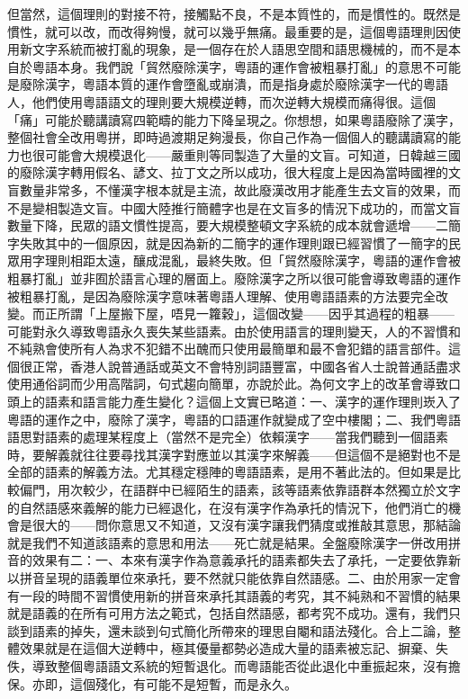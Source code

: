 \documentclass[a5paper, 10pt, openany]{book} %
\begin{document}
但當然，這個理則的對接不符，接觸點不良，不是本質性的，而是慣性的。既然是慣性，就可以改，而改得夠慢，就可以幾乎無痛。最重要的是，這個粵語理則因使用新文字系統而被打亂的現象，是一個存在於人語思空間和語思機械的，而不是本自於粵語本身。我們說「貿然廢除漢字，粵語的運作會被粗暴打亂」的意思不可能是廢除漢字，粵語本質的運作會墮亂或崩潰，而是指身處於廢除漢字一代的粵語人，他們使用粵語語文的理則要大規模逆轉，而次逆轉大規模而痛得很。這個「痛」可能於聽講讀寫四範疇的能力下降呈現之。你想想，如果粵語廢除了漢字，整個社會全改用粵拼，即時過渡期足夠漫長，你自己作為一個個人的聽講讀寫的能力也很可能會大規模退化——嚴重則等同製造了大量的文盲。可知道，日韓越三國的廢除漢字轉用假名、諺文、拉丁文之所以成功，很大程度上是因為當時國裡的文盲數量非常多，不懂漢字根本就是主流，故此廢漢改用才能產生去文盲的效果，而不是變相製造文盲。中國大陸推行簡體字也是在文盲多的情況下成功的，而當文盲數量下降，民眾的語文慣性提高，要大規模整頓文字系統的成本就會遞增——二簡字失敗其中的一個原因，就是因為新的二簡字的運作理則跟已經習慣了一簡字的民眾用字理則相距太遠，釀成混亂，最終失敗。但「貿然廢除漢字，粵語的運作會被粗暴打亂」並非囿於語言心理的層面上。廢除漢字之所以很可能會導致粵語的運作被粗暴打亂，是因為廢除漢字意味著粵語人理解、使用粵語語素的方法要完全改變。而正所謂「上屋搬下屋，唔見一籮穀」，這個改變——因乎其過程的粗暴——可能對永久導致粵語永久喪失某些語素。由於使用語言的理則變天，人的不習慣和不純熟會使所有人為求不犯錯不出醜而只使用最簡單和最不會犯錯的語言部件。這個很正常，香港人說普通話或英文不會特別詞語豐富，中國各省人士說普通話盡求使用通俗詞而少用高階詞，句式趨向簡單，亦說於此。為何文字上的改革會導致口頭上的語素和語言能力產生變化？這個上文實已略道：一、漢字的運作理則崁入了粵語的運作之中，廢除了漢字，粵語的口語運作就變成了空中樓閣；二、我們粵語語思對語素的處理某程度上（當然不是完全）依賴漢字——當我們聽到一個語素時，要解義就往往要尋找其漢字對應並以其漢字來解義——但這個不是絕對也不是全部的語素的解義方法。尤其穩定穩陣的粵語語素，是用不著此法的。但如果是比較偏門，用次較少，在語群中已經陌生的語素，該等語素依靠語群本然獨立於文字的自然語感來義解的能力已經退化，在沒有漢字作為承托的情況下，他們消亡的機會是很大的——問你意思又不知道，又沒有漢字讓我們猜度或推敲其意思，那結論就是我們不知道該語素的意思和用法——死亡就是結果。全盤廢除漢字一併改用拼音的效果有二：一、本來有漢字作為意義承托的語素都失去了承托，一定要依靠新以拼音呈現的語義單位來承托，要不然就只能依靠自然語感。二、由於用家一定會有一段的時間不習慣使用新的拼音來承托其語義的考究，其不純熟和不習慣的結果就是語義的在所有可用方法之範式，包括自然語感，都考究不成功。還有，我們只談到語素的掉失，還未談到句式簡化所帶來的理思自閹和語法殘化。合上二論，整體效果就是在這個大逆轉中，極其優量都勢必造成大量的語素被忘記、摒棄、失佚，導致整個粵語語文系統的短暫退化。而粵語能否從此退化中重振起來，沒有擔保。亦即，這個殘化，有可能不是短暫，而是永久。
\end{document}
